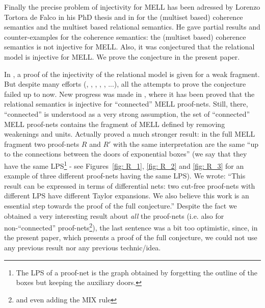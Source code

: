 \documentclass{article}
\theoremstyle{plain}
\begin{document}
Finally the precise problem of  injectivity for MELL has been adressed by Lorenzo Tortora de Falco in his PhD thesis \cite{phdtortora} and in \cite{injectcoh} for the (multiset based) coherence semantics and the multiset based relational semantics. 
He gave partial results and counter-examples for the coherence semantics: the (multiset based) coherence semantics is not injective for MELL.  
Also, it was conjectured that the relational model is
injective for MELL. We prove the conjecture in the present paper.



In \cite{injectcoh}, a proof of the injectivity of the relational model is given for a weak fragment. 
But despite many efforts (\cite{phdtortora}, \cite{injectcoh}, \cite{boudesunifying}, \cite{pagani06a}, \cite{separationdiff}, \cite{taylorexpansioninverse}...), all
the attempts to prove the conjecture failed up to now. 
New progress was made in \cite{LPSinjectivity}, where it has been proved that the relational semantics is injective for ``connected'' MELL proof-nets. Still, there, ``connected'' is understood as a very strong assumption, the set of ``connected'' MELL proof-nets contains the fragment of MELL defined by removing weakenings and units. Actually \cite{LPSinjectivity} proved a much stronger result: in the full MELL fragment two proof-nets $R$ and $R'$ with the same
interpretation are the same ``up to the connections between the doors of exponential
boxes'' (we say that they have the same LPS\footnote{The LPS of a proof-net is the graph obtained by forgetting the outline of the boxes but keeping the auxiliary doors.} - see Figures~\ref{fig: R_1}, \ref{fig: R_2} and \ref{fig: R_3} for an example of three different proof-nets having the same LPS). We wrote: ``This result can be expressed in terms of differential nets: two cut-free proof-nets with different LPS have different Taylor expansions. We also believe this work is an essential step
towards the proof of the full conjecture.'' Despite the fact we obtained a very interesting result about \emph{all} the proof-nets (i.e. also for non-``connected'' proof-nets\footnote{and even adding the MIX rule}), the last sentence was a bit too optimistic, since, in the present paper, which presents a proof of the full conjecture, we could not use any previous result nor any previous technic/idea.
\end{document}
